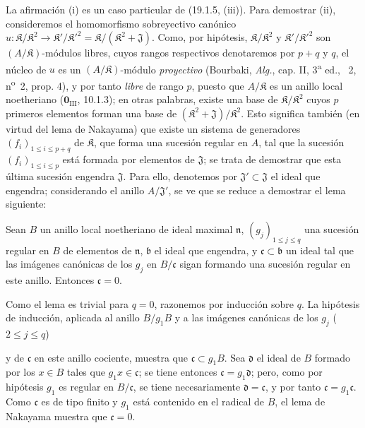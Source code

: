 La afirmación (i) es un caso particular de (19.1.5, (iii)). Para demostrar (ii), consideremos el homomorfismo sobreyectivo canónico $u:\mathfrak K/\mathfrak K^2\to\mathfrak K'/\mathfrak K'^2=\mathfrak K/(\mathfrak K^2+\mathfrak J)$. Como, por hipótesis, $\mathfrak K/\mathfrak K^2$ y $\mathfrak K'/\mathfrak K'^2$ son $(A/\mathfrak K)$-módulos libres, cuyos rangos respectivos denotaremos por $p+q$ y $q$, el núcleo de $u$ es un $(A/\mathfrak K)$-módulo \emph{proyectivo} (Bourbaki, \emph{Alg.}, cap. II, 3\textsuperscript{a} ed., \textsection~2, n\textsuperscript{o}~2, prop. 4), y por tanto \emph{libre} de rango $p$, puesto que $A/\mathfrak K$ es un anillo local noetheriano ($\mathbf{0}_{\mathrm{III}}$, 10.1.3); en otras palabras, existe una base de $\mathfrak K/\mathfrak K^2$ cuyos $p$ primeros elementos forman una base de $(\mathfrak K^2+\mathfrak J)/\mathfrak K^2$. Esto significa también (en virtud del lema de Nakayama) que existe un sistema de generadores $(f_i)_{1\leq i\leq p+q}$ de $\mathfrak K$, que forma una sucesión regular en $A$, tal que la sucesión $(f_i)_{1\leq i\leq p}$ está formada por elementos de $\mathfrak J$; se trata de demostrar que esta última sucesión engendra $\mathfrak J$. Para ello, denotemos por $\mathfrak J'\subset\mathfrak J$ el ideal que engendra; considerando el anillo $A/\mathfrak J'$, se ve que se reduce a demostrar el lema siguiente:

\begin{lemma}[19.1.6.1]
\label{IV.19.1.6.1}
Sean $B$ un anillo local noetheriano de ideal maximal $\mathfrak n$, $(g_j)_{1\leq j\leq q}$ una sucesión regular en $B$ de elementos de $\mathfrak n$, $\mathfrak b$ el ideal que engendra, y $\mathfrak c\subset\mathfrak b$ un ideal tal que las imágenes canónicas de los $g_j$ en $B/\mathfrak c$ sigan formando una sucesión regular en este anillo. Entonces $\mathfrak c=0$.
\end{lemma}

Como el lema es trivial para $q=0$, razonemos por inducción sobre $q$. La hipótesis de inducción, aplicada al anillo $B/g_1B$ y a las imágenes canónicas de los $g_j$ ($2\leq j\leq q$)


y de $\mathfrak c$ en este anillo cociente, muestra que $\mathfrak c\subset g_1B$. Sea $\mathfrak d$ el ideal de $B$ formado por los $x\in B$ tales que $g_1x\in\mathfrak c$; se tiene entonces $\mathfrak c=g_1\mathfrak d$; pero, como por hipótesis $g_1$ es regular en $B/\mathfrak c$, se tiene necesariamente $\mathfrak d=\mathfrak c$, y por tanto $\mathfrak c=g_1\mathfrak c$. Como $\mathfrak c$ es de tipo finito y $g_1$ está contenido en el radical de $B$, el lema de Nakayama muestra que $\mathfrak c=0$.

